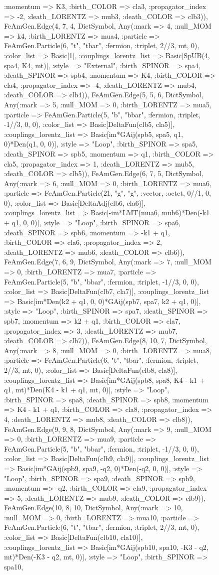 \documentclass{revtex4}
\begin{document}
\begin{figure}[!htb]
\begin{center}
{:momentum => K3, :birth_COLOR => cla3, :propagator_index => -2, :death_LORENTZ => mub3, :death_COLOR => clb3)), FeAmGen.Edge(4, 7, 4, Dict{Symbol, Any}(:mark => 4, :null_MOM => k4, :birth_LORENTZ => mua4, :particle => FeAmGen.Particle(6, "t", "tbar", :fermion, :triplet, 2//3, mt, 0), :color_list => Basic[1], :couplings_lorentz_list => Basic[SpUB(4, spa4, K4, mt)], :style => "External", :birth_SPINOR => spa4, :death_SPINOR => spb4, :momentum => K4, :birth_COLOR => cla4, :propagator_index => -4, :death_LORENTZ => mub4, :death_COLOR => clb4)), FeAmGen.Edge(5, 5, 6, Dict{Symbol, Any}(:mark => 5, :null_MOM => 0, :birth_LORENTZ => mua5, :particle => FeAmGen.Particle(5, "b", "bbar", :fermion, :triplet, -1//3, 0, 0), :color_list => Basic[DeltaFun(clb5, cla5)], :couplings_lorentz_list => Basic[im*GAij(spb5, spa5, q1, 0)*Den(q1, 0, 0)], :style => "Loop", :birth_SPINOR => spa5, :death_SPINOR => spb5, :momentum => q1, :birth_COLOR => cla5, :propagator_index => 1, :death_LORENTZ => mub5, :death_COLOR => clb5)), FeAmGen.Edge(6, 7, 5, Dict{Symbol, Any}(:mark => 6, :null_MOM => 0, :birth_LORENTZ => mua6, :particle => FeAmGen.Particle(21, "g", "g", :vector, :octet, 0//1, 0, 0), :color_list => Basic[DeltaAdj(clb6, cla6)], :couplings_lorentz_list => Basic[-im*LMT(mua6, mub6)*Den(-k1 + q1, 0, 0)], :style => "Loop", :birth_SPINOR => spa6, :death_SPINOR => spb6, :momentum => -k1 + q1, :birth_COLOR => cla6, :propagator_index => 2, :death_LORENTZ => mub6, :death_COLOR => clb6)), FeAmGen.Edge(7, 6, 9, Dict{Symbol, Any}(:mark => 7, :null_MOM => 0, :birth_LORENTZ => mua7, :particle => FeAmGen.Particle(5, "b", "bbar", :fermion, :triplet, -1//3, 0, 0), :color_list => Basic[DeltaFun(clb7, cla7)], :couplings_lorentz_list => Basic[im*Den(k2 + q1, 0, 0)*GAij(spb7, spa7, k2 + q1, 0)], :style => "Loop", :birth_SPINOR => spa7, :death_SPINOR => spb7, :momentum => k2 + q1, :birth_COLOR => cla7, :propagator_index => 3, :death_LORENTZ => mub7, :death_COLOR => clb7)), FeAmGen.Edge(8, 10, 7, Dict{Symbol, Any}(:mark => 8, :null_MOM => 0, :birth_LORENTZ => mua8, :particle => FeAmGen.Particle(6, "t", "tbar", :fermion, :triplet, 2//3, mt, 0), :color_list => Basic[DeltaFun(clb8, cla8)], :couplings_lorentz_list => Basic[im*GAij(spb8, spa8, K4 - k1 + q1, mt)*Den(K4 - k1 + q1, mt, 0)], :style => "Loop", :birth_SPINOR => spa8, :death_SPINOR => spb8, :momentum => K4 - k1 + q1, :birth_COLOR => cla8, :propagator_index => 4, :death_LORENTZ => mub8, :death_COLOR => clb8)), FeAmGen.Edge(9, 9, 8, Dict{Symbol, Any}(:mark => 9, :null_MOM => 0, :birth_LORENTZ => mua9, :particle => FeAmGen.Particle(5, "b", "bbar", :fermion, :triplet, -1//3, 0, 0), :color_list => Basic[DeltaFun(clb9, cla9)], :couplings_lorentz_list => Basic[im*GAij(spb9, spa9, -q2, 0)*Den(-q2, 0, 0)], :style => "Loop", :birth_SPINOR => spa9, :death_SPINOR => spb9, :momentum => -q2, :birth_COLOR => cla9, :propagator_index => 5, :death_LORENTZ => mub9, :death_COLOR => clb9)), FeAmGen.Edge(10, 8, 10, Dict{Symbol, Any}(:mark => 10, :null_MOM => 0, :birth_LORENTZ => mua10, :particle => FeAmGen.Particle(6, "t", "tbar", :fermion, :triplet, 2//3, mt, 0), :color_list => Basic[DeltaFun(clb10, cla10)], :couplings_lorentz_list => Basic[im*GAij(spb10, spa10, -K3 - q2, mt)*Den(-K3 - q2, mt, 0)], :style => "Loop", :birth_SPINOR => spa10, }
\end{center}
\end{figure}
\end{document}
